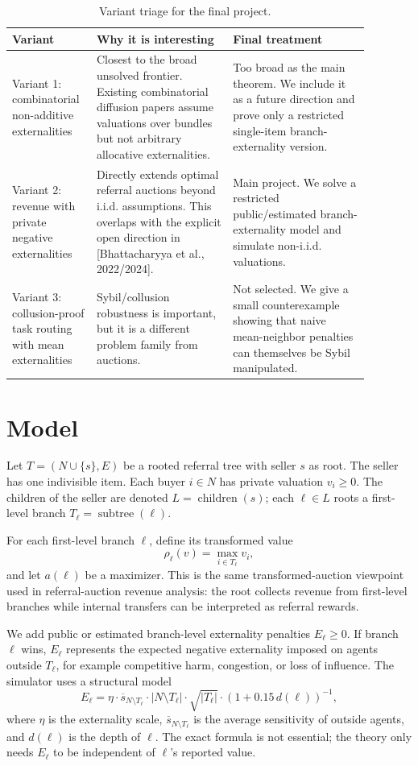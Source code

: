 \documentclass[11pt]{article}
\newcommand{\children}{\operatorname{children}}
\newcommand{\subtree}{\operatorname{subtree}}
\begin{document}
\begin{table}[h]
\centering
\caption{Variant triage for the final project.}
\label{tab:variants}
\begin{tabular}{p{0.18\linewidth}p{0.35\linewidth}p{0.35\linewidth}}
\toprule
Variant & Why it is interesting & Final treatment \\
\midrule
Variant 1: combinatorial non-additive externalities & Closest to the broad unsolved frontier. Existing combinatorial diffusion papers assume valuations over bundles but not arbitrary allocative externalities. & Too broad as the main theorem. We include it as a future direction and prove only a restricted single-item branch-externality version. \\
Variant 2: revenue with private negative externalities & Directly extends optimal referral auctions beyond i.i.d. assumptions. This overlaps with the explicit open direction in [Bhattacharyya et al., 2022/2024]. & Main project. We solve a restricted public/estimated branch-externality model and simulate non-i.i.d. valuations. \\
Variant 3: collusion-proof task routing with mean externalities & Sybil/collusion robustness is important, but it is a different problem family from auctions. & Not selected. We give a small counterexample showing that naive mean-neighbor penalties can themselves be Sybil manipulated. \\
\bottomrule
\end{tabular}
\end{table}

\section{Model}

Let $T=(N\cup\{s\},E)$ be a rooted referral tree with seller $s$ as root. The seller has one indivisible item. Each buyer $i\in N$ has private valuation $v_i\ge 0$. The children of the seller are denoted $L=\children(s)$; each $\ell\in L$ roots a first-level branch $T_\ell=\subtree(\ell)$.

For each first-level branch $\ell$, define its transformed value
\[
    \rho_\ell(v)=\max_{i\in T_\ell} v_i,
\]
and let $a(\ell)$ be a maximizer. This is the same transformed-auction viewpoint used in referral-auction revenue analysis: the root collects revenue from first-level branches while internal transfers can be interpreted as referral rewards.

We add public or estimated branch-level externality penalties $E_\ell\ge 0$. If branch $\ell$ wins, $E_\ell$ represents the expected negative externality imposed on agents outside $T_\ell$, for example competitive harm, congestion, or loss of influence. The simulator uses a structural model
\[
E_\ell = \eta \cdot \overline{s}_{N\setminus T_\ell}\cdot |N\setminus T_\ell|\cdot \sqrt{|T_\ell|}\cdot (1+0.15\,d(\ell))^{-1},
\]
where $\eta$ is the externality scale, $\overline{s}_{N\setminus T_\ell}$ is the average sensitivity of outside agents, and $d(\ell)$ is the depth of $\ell$. The exact formula is not essential; the theory only needs $E_\ell$ to be independent of $\ell$'s reported value.
\end{document}
